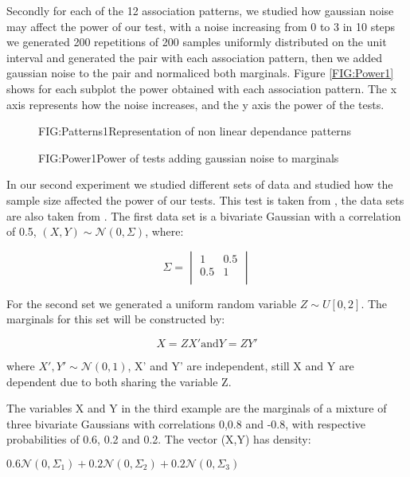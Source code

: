 Secondly for each of the 12 association patterns, we studied how gaussian noise may affect the power of our test, with a noise increasing from 0 to 3 in 10 steps we generated 200 repetitions of 200 samples uniformly distributed on the unit interval and generated the pair with each association pattern, then we added gaussian noise to the pair and normaliced both marginals.
Figure \ref{FIG:Power1} shows for each subplot the power obtained with each association pattern. The x axis represents how the noise increases, and the y axis the power of the tests.

\begin{figure}[Non linear dependance patterns example 1]{FIG:Patterns1}{Representation of non linear dependance patterns}
\end{figure}

\begin{figure}[Power of tests uniform marginals same size adding noise]{FIG:Power1}{Power of tests adding gaussian noise to marginals}
\end{figure}

In our second experiment we studied different sets of data and studied how the sample size affected the power of our tests. This test is taken from \cite{Size}, the data sets are also taken from \cite{Size}.
The first data set is a bivariate Gaussian with a correlation of 0.5, $(X,Y)\sim \mathcal{N}(0,\Sigma)$, where:

$$\Sigma =
\begin{vmatrix}
1&0.5\\
0.5&1\\
\end{vmatrix}
$$

For the second set we generated a uniform random variable $Z\sim U[0,2]$. The marginals for this set will be constructed by:

$$X=ZX' \text{and} Y = ZY'$$

where $X',Y' \sim \mathcal{N}(0,1)$, X' and Y' are independent, still X and Y are dependent due to both sharing the variable Z.

The variables X and Y in the third example are the marginals of a mixture of three bivariate Gaussians with correlations 0,0.8 and -0.8, with respective probabilities of 0.6, 0.2 and 0.2. 
The vector (X,Y) has density:

$0.6\mathcal{N}(0,\Sigma_{1}) + 0.2\mathcal{N}(0,\Sigma_{2}) + 0.2\mathcal{N}(0,\Sigma_{3})$

